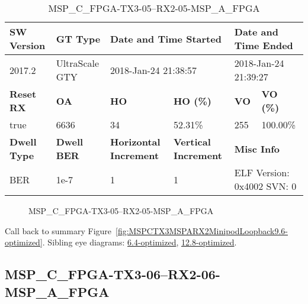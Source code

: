 \begin{table}[h]
\centering
\caption{MSP\_C\_FPGA-TX3-05--RX2-05-MSP\_A\_FPGA}
\label{tab:MSPCFPGATX305RX205MSPAFPGA9.6-optimized}
\begin{tabular}{@{}|l|l|l|l|l|l|@{}}
\toprule
\textbf{SW Version}                & \textbf{GT Type}   & \multicolumn{2}{l|}{\textbf{Date and Time Started}}            & \multicolumn{2}{l|}{\textbf{Date and Time Ended}}        \\ \midrule
2017.2                       & UltraScale GTY          & \multicolumn{2}{l|}{2018-Jan-24 21:38:57}                   & \multicolumn{2}{l|}{2018-Jan-24 21:39:27}               \\ \midrule
\textbf{Reset RX}                  & \textbf{OA} & \textbf{HO}   & \textbf{HO (\%)} & \textbf{VO} & \textbf{VO (\%)} \\ \midrule
true & 6636        & 34          & 52.31\%        & 255        & 100.00\%       \\ \midrule
\textbf{Dwell Type}                & \textbf{Dwell BER} & \textbf{Horizontal Increment} & \textbf{Vertical Increment}    & \multicolumn{2}{l|}{\textbf{Misc Info}}                  \\ \midrule
BER                            & 1e-7        & 1        & 1           & \multicolumn{2}{l|}{ELF Version: 0x4002 SVN: 0}                         \\ \bottomrule
\end{tabular}
\end{table}

\begin{figure}[h]
\caption{MSP\_C\_FPGA-TX3-05--RX2-05-MSP\_A\_FPGA} \label{fig:MSPCFPGATX305RX205MSPAFPGA9.6-optimized}
\end{figure}

Call back to summary Figure~\ref{fig:MSPCTX3MSPARX2MinipodLoopback9.6-optimized}.
Sibling eye diagrams: \hyperref[sec:MSPCFPGATX305RX205MSPAFPGA6.4-optimized]{6.4-optimized}, \hyperref[sec:MSPCFPGATX305RX205MSPAFPGA12.8-optimized]{12.8-optimized}.

\clearpage
\newpage


\subsection{MSP\_C\_FPGA-TX3-06--RX2-06-MSP\_A\_FPGA}\label{sec:MSPCFPGATX306RX206MSPAFPGA9.6-optimized}

